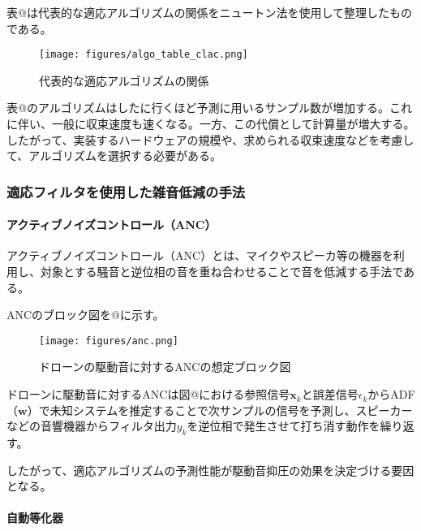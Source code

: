 表@は代表的な適応アルゴリズムの関係をニュートン法を使用して整理したものである。

\begin{figure}
\centering
\texttt{[image: figures/algo\_table\_clac.png]}
\caption{代表的な適応アルゴリズムの関係}
\end{figure}

表@のアルゴリズムはしたに行くほど予測に用いるサンプル数が増加する。これに伴い、一般に収束速度も速くなる。一方、この代償として計算量が増大する。したがって、実装するハードウェアの規模や、求められる収束速度などを考慮して、アルゴリズムを選択する必要がある。

\hypertarget{ux9069ux5fdcux30d5ux30a3ux30ebux30bfux3092ux4f7fux7528ux3057ux305fux96d1ux97f3ux4f4eux6e1bux306eux624bux6cd5}{%
\subsubsection{適応フィルタを使用した雑音低減の手法}\label{ux9069ux5fdcux30d5ux30a3ux30ebux30bfux3092ux4f7fux7528ux3057ux305fux96d1ux97f3ux4f4eux6e1bux306eux624bux6cd5}}

\hypertarget{ux30a2ux30afux30c6ux30a3ux30d6ux30ceux30a4ux30baux30b3ux30f3ux30c8ux30edux30fcux30ebanc}{%
\paragraph{アクティブノイズコントロール（ANC）}\label{ux30a2ux30afux30c6ux30a3ux30d6ux30ceux30a4ux30baux30b3ux30f3ux30c8ux30edux30fcux30ebanc}}

アクティブノイズコントロール（ANC）とは、マイクやスピーカ等の機器を利用し、対象とする騒音と逆位相の音を重ね合わせることで音を低減する手法である。

ANCのブロック図を@に示す。

\begin{figure}
\centering
\texttt{[image: figures/anc.png]}
\caption{ドローンの駆動音に対するANCの想定ブロック図}
\end{figure}

ドローンに駆動音に対するANCは図@における参照信号\(\bm{x}_k\)と誤差信号\(\epsilon_k\)からADF（\(\bm{w}\)）で未知システムを推定することで次サンプルの信号を予測し、スピーカーなどの音響機器からフィルタ出力\(y_k\)を逆位相で発生させて打ち消す動作を繰り返す。

したがって、適応アルゴリズムの予測性能が駆動音抑圧の効果を決定づける要因となる。

\hypertarget{ux81eaux52d5ux7b49ux5316ux5668}{%
\paragraph{自動等化器}\label{ux81eaux52d5ux7b49ux5316ux5668}}

